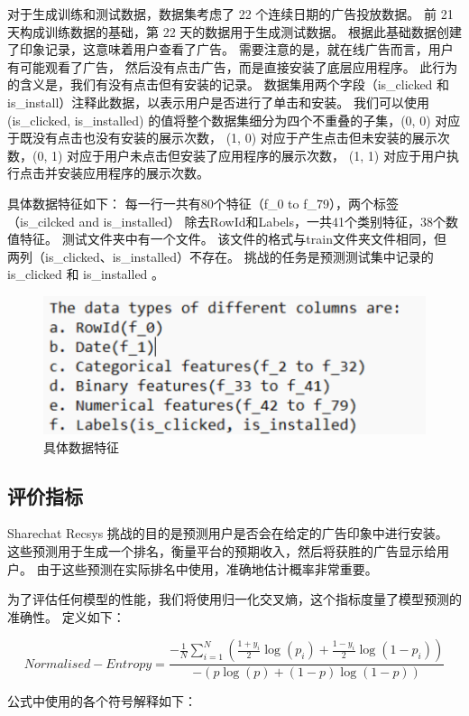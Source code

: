 \documentclass{article}
\begin{document}
对于生成训练和测试数据，数据集考虑了 22 个连续日期的广告投放数据。 
前 21 天构成训练数据的基础，第 22 天的数据用于生成测试数据。 
根据此基础数据创建了印象记录，这意味着用户查看了广告。 需要注意的是，就在线广告而言，用户有可能观看了广告，
然后没有点击广告，而是直接安装了底层应用程序。 此行为的含义是，我们有没有点击但有安装的记录。
数据集用两个字段（is\_clicked 和 is\_install）注释此数据，以表示用户是否进行了单击和安装。 
我们可以使用 (is\_clicked, is\_installed) 的值将整个数据集细分为四个不重叠的子集，(0, 0) 对应于既没有点击也没有安装的展示次数，
(1, 0) 对应于产生点击但未安装的展示次数，(0, 1) 对应于用户未点击但安装了应用程序的展示次数， 
(1, 1) 对应于用户执行点击并安装应用程序的展示次数。

具体数据特征如下：
每一行一共有80个特征（f\_0 to f\_79），两个标签（is\_cilcked and is\_installed）
除去RowId和Labels，一共41个类别特征，38个数值特征。
测试文件夹中有一个文件。 该文件的格式与train文件夹文件相同，但
两列（is\_clicked、is\_installed）不存在。
挑战的任务是预测测试集中记录的 is\_clicked 和 is\_installed 。
\begin{figure}[htbp]
  \centering
  \includegraphics[scale=0.3]{data.png}
  \caption{具体数据特征}
  \label{figure3}
\end{figure}

\subsection{评价指标}
Sharechat Recsys 挑战的目的是预测用户是否会在给定的广告印象中进行安装。
这些预测用于生成一个排名，衡量平台的预期收入，然后将获胜的广告显示给用户。
由于这些预测在实际排名中使用，准确地估计概率非常重要。

为了评估任何模型的性能，我们将使用归一化交叉熵，这个指标度量了模型预测的准确性。
定义如下：

$$
Normalised-Entropy = \frac{-\frac{1}{N}\sum_{i=1}^N(\frac{1+y_i}{2}\log(p_i)+\frac{1-y_i}{2}\log(1-p_i))}{-(p\log(p)+(1-p)\log(1-p))}
$$

公式中使用的各个符号解释如下：
\end{document}
